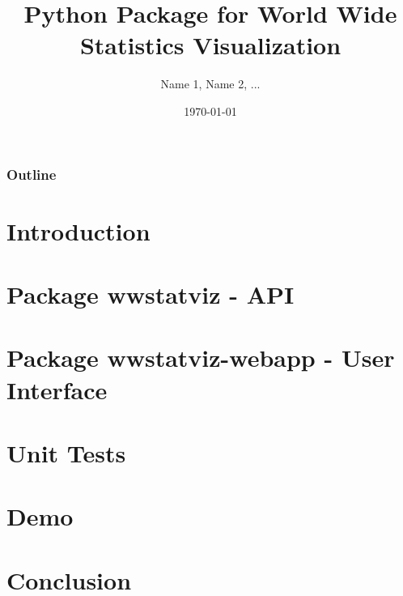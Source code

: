 \documentclass{beamer}
\title{Python Package for World Wide Statistics Visualization}
\subtitle{}
\author{\footnotesize{Name 1, Name 2, ...}}
\date{\today}
\institute{Université de Montpellier}
\begin{document}
\begin{frame}[plain]
  \titlepage
\end{frame}

\small
\begin{frame}[plain]
  \frametitle{Outline}
  \tableofcontents
\end{frame}
\normalsize

\section{Introduction}


\section{Package wwstatviz - API}


\section{Package wwstatviz-webapp - User Interface}


\section{Unit Tests}


\section{Demo}


\section{Conclusion}

\end{document}
